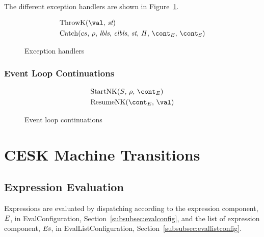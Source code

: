 \documentclass[a4paper,oneside,fleqn]{article}
\begin{document}
The different exception handlers are shown in Figure~\ref{figure:handlers}.
\newcommand{\ThrowH}[2]{\mathrm{ThrowK}({#1},\,{#2})}
\newcommand{\CatchH}[1]{\mathrm{Catch}({#1},\,\env,\,\lbls,\,\clbls,\,\strace,\,\handler,\,\econt,\,\scont)}

\begin{figure}[Htp]
  \begin{eqfigure}
  \begin{align}
    &\ThrowH{\val}{\strace} \label{handle:throw} \\
    &\CatchH{cs} \label{handle:catch}
  \end{align}
  \caption{Exception handlers}
  \label{figure:handlers}
  \end{eqfigure}
\end{figure}


\subsubsection{Event Loop Continuations}

\newcommand{\StartNK}[3]{\mathrm{StartNK}({#1},\,{#2},\,{#3})}
\newcommand{\ResumeNK}[2]{\mathrm{ResumeNK}({#1},\,{#2})}

\begin{figure}[Htp]
    \begin{eqfigure}
        \begin{align}
            &\StartNK{\stmt}{\env}{\econt}\\
            &\ResumeNK{\econt}{\val}
        \end{align}
        \caption{Event loop continuations}
    \end{eqfigure}
\end{figure}


\section{CESK Machine Transitions}
\label{sec:semantics}


\subsection{Expression Evaluation}
\label{subsec:expr-evaluation}


Expressions are evaluated by dispatching according to the expression component, $\mathit{E}$, in EvalConfiguration, Section~\ref{subsubsec:evalconfig}, and the list of expression component, $\mathit{E}\mathit{s}$, in EvalListConfiguration, Section~\ref{subsubsec:evallistconfig}.
\end{document}
